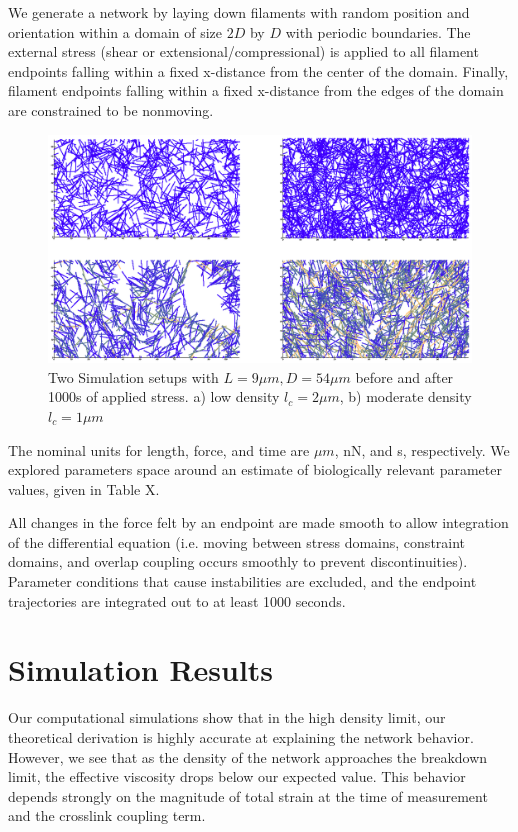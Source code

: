 \documentclass[prb,11pt]{revtex4-1}
\begin{document}
We generate a network by laying down filaments with random position and orientation within a domain of size $2D$ by $D$ with periodic boundaries.  The external stress (shear or extensional/compressional) is applied to all filament endpoints falling within a fixed x-distance from the center of the domain.  Finally, filament endpoints falling within a fixed x-distance from the edges of the domain are constrained to be nonmoving.

\begin{figure}[h!]
\centering
\includegraphics[width=\textwidth]{network_def}
\caption{\label{fig:sim}Two Simulation setups with $L=9 \mu m, D = 54 \mu m$ before and after 1000s of applied stress. a) low density $l_c=2 \mu m$, b) moderate density $l_c=1 \mu m$ }
\end{figure}

The nominal units for length, force, and time are $\mu m$, nN, and s, respectively.  We explored parameters space around an estimate of biologically relevant parameter values, given in Table X. 

All changes in the force felt by an endpoint are made smooth to allow integration of the differential equation (i.e. moving between stress domains, constraint domains, and overlap coupling occurs smoothly to prevent discontinuities).  Parameter conditions that cause instabilities are excluded, and the endpoint trajectories are integrated out to at least 1000 seconds. 


\section{Simulation Results}

Our computational simulations show that in the high density limit, our theoretical derivation is highly accurate at explaining the network behavior.  However, we see that as the density of the network approaches the breakdown limit, the effective viscosity drops below our expected value.  This behavior depends strongly on the magnitude of total strain at the time of measurement and the crosslink coupling term. 
\end{document}

